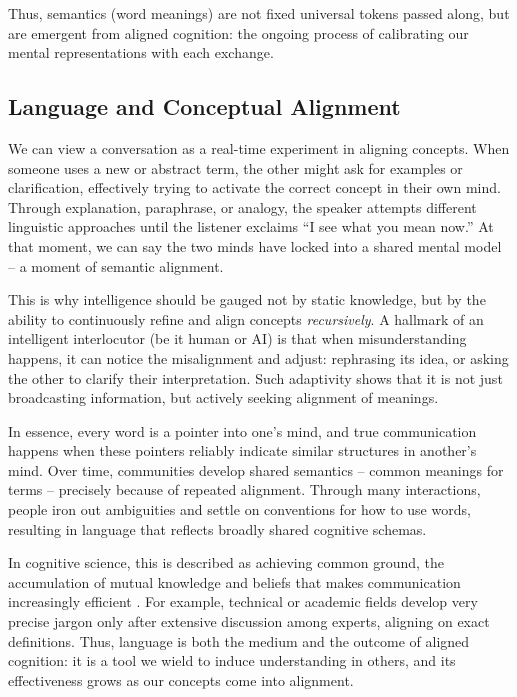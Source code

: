 \documentclass{article}
\begin{document}
Thus, semantics (word meanings) are not fixed universal tokens passed along, but are emergent from aligned cognition: the ongoing process of calibrating our mental representations with each exchange.

\subsection{Language and Conceptual Alignment}

We can view a conversation as a real-time experiment in aligning concepts. When someone uses a new or abstract term, the other might ask for examples or clarification, effectively trying to activate the correct concept in their own mind. Through explanation, paraphrase, or analogy, the speaker attempts different linguistic approaches until the listener exclaims ``I see what you mean now.'' At that moment, we can say the two minds have locked into a shared mental model -- a moment of semantic alignment.

This is why intelligence should be gauged not by static knowledge, but by the ability to continuously refine and align concepts \emph{recursively}. A hallmark of an intelligent interlocutor (be it human or AI) is that when misunderstanding happens, it can notice the misalignment and adjust: rephrasing its idea, or asking the other to clarify their interpretation. Such adaptivity shows that it is not just broadcasting information, but actively seeking alignment of meanings.

In essence, every word is a pointer into one's mind, and true communication happens when these pointers reliably indicate similar structures in another's mind. Over time, communities develop shared semantics -- common meanings for terms -- precisely because of repeated alignment. Through many interactions, people iron out ambiguities and settle on conventions for how to use words, resulting in language that reflects broadly shared cognitive schemas.

In cognitive science, this is described as achieving common ground, the accumulation of mutual knowledge and beliefs that makes communication increasingly efficient \citep{rane2024}. For example, technical or academic fields develop very precise jargon only after extensive discussion among experts, aligning on exact definitions. Thus, language is both the medium and the outcome of aligned cognition: it is a tool we wield to induce understanding in others, and its effectiveness grows as our concepts come into alignment.
\end{document}
